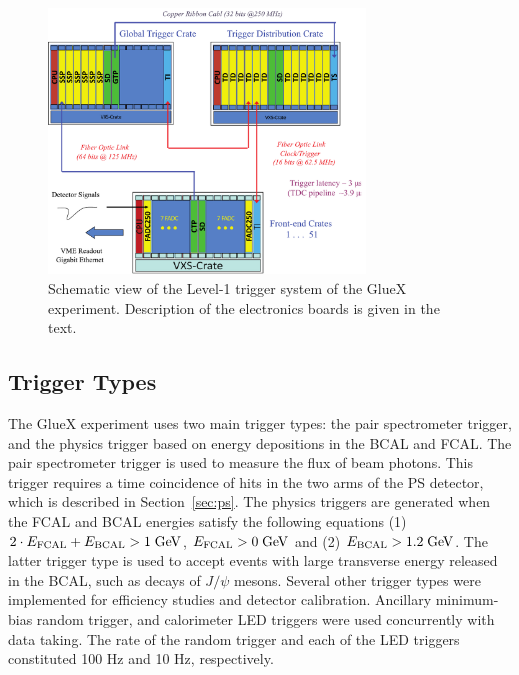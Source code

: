 \begin{figure}[tbp]
\begin{center}
\includegraphics[width=0.75\textwidth]{figures/125_Somov-f1.pdf}  
\caption{Schematic view of the Level-1 trigger system of the GlueX experiment. Description of the electronics boards is given in the text.} \label{fig:trig}
\end{center}
\end{figure}

\subsection{Trigger Types \label{sec:triggers}}

The GlueX experiment uses two main trigger types: the pair spectrometer trigger, and the physics trigger based on energy depositions in the BCAL and FCAL. The 
pair spectrometer trigger is used to measure the flux of beam photons. This trigger requires a time coincidence of hits in the 
two arms of the PS detector, which is described in Section~\ref{sec:ps}. The physics triggers are generated when the FCAL and BCAL energies  satisfy the following equations (1) $2\cdot E_{\rm FCAL} + E_{\rm BCAL} > 1\;{\rm GeV}$,  $E_{\rm FCAL} > 0\; {\rm GeV}$ and (2) $E_{\rm BCAL} > 1.2\;{\rm GeV}$. The latter trigger type is used to accept events with large transverse energy released in the BCAL, such as decays of $J/\psi$ mesons.
Several other trigger types were implemented for efficiency studies and detector calibration. Ancillary minimum-bias random trigger, 
and calorimeter LED triggers were used concurrently with data taking. The rate of the random trigger and each of the LED triggers constituted 100 Hz and 10 Hz, respectively.

